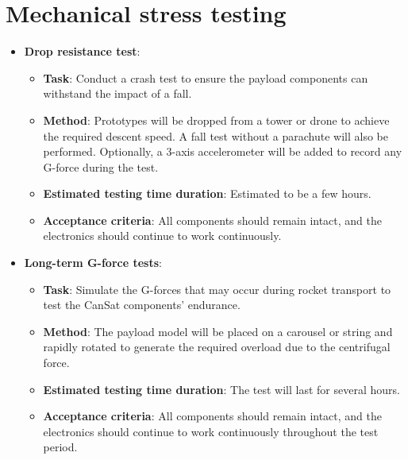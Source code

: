 \documentclass[11pt]{article}
\begin{document}
\section{Mechanical stress testing}\label{A33333}


\begin{itemize}[labelwidth=0cm, leftmargin=0cm, itemindent=0.7cm, noitemsep, topsep=0pt, label={}]
\item \textbf{Drop resistance test}:
\begin{itemize}[labelwidth=2cm, leftmargin=1.9cm, label=, noitemsep, topsep=2pt]
\item[\faTasks] \textbf{Task}: Conduct a crash test to ensure the payload components can withstand the impact of a fall.
\item[\faFlask] \textbf{Method}: Prototypes will be dropped from a tower or drone to achieve the required descent speed. A fall test without a parachute will also be performed. Optionally, a 3-axis accelerometer will be added to record any G-force during the test.
\item[{\faHourglass[3]}] \textbf{Estimated testing time duration}: Estimated to be a few hours.
\item[{\faCheckSquare}] \textbf{Acceptance criteria}: All components should remain intact, and the electronics should continue to work continuously.
\end{itemize}
\item \textbf{Long-term G-force tests}:
\begin{itemize}[labelwidth=2cm, leftmargin=1.9cm, label=, noitemsep, topsep=2pt]
\item[\faTasks] \textbf{Task}: Simulate the G-forces that may occur during rocket transport to test the CanSat components' endurance.
\item[\faFlask] \textbf{Method}: The payload model will be placed on a carousel or string and rapidly rotated to generate the required overload due to the centrifugal force.
\item[{\faHourglass[3]}] \textbf{Estimated testing time duration}: The test will last for several hours.
\item[{\faCheckSquare}] \textbf{Acceptance criteria}: All components should remain intact, and the electronics should continue to work continuously throughout the test period.
\end{itemize}
\end{itemize}
\end{document}

